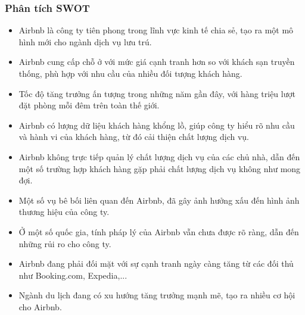 \subsubsection{Phân tích SWOT}
\begin{tcbraster}[raster columns=2, boxrule=0mm, arc=0mm]
\begin{tcolorbox}[equal height group=A, size=fbox, colback=swotS!60, colframe=swotS!80!black, title=\textsc{strengths}]
\begin{itemize}
\item Airbnb là công ty tiên phong trong lĩnh vực kinh tế chia sẻ, tạo ra một mô hình mới cho ngành dịch vụ lưu trú.
\item Airbnb cung cấp chỗ ở với mức giá cạnh tranh hơn so với khách sạn truyền thống, phù hợp với nhu cầu của nhiều đối tượng khách hàng.
\item Tốc độ tăng trưởng ấn tượng trong những năm gần đây, với hàng triệu lượt đặt phòng mỗi đêm trên toàn thế giới.
\item Airbnb có lượng dữ liệu khách hàng khổng lồ, giúp công ty hiểu rõ nhu cầu và hành vi của khách hàng, từ đó cải thiện chất lượng dịch vụ.
\end{itemize}
\end{tcolorbox}
\begin{tcolorbox}[equal height group=A, size=fbox, colback=swotW!60, colframe=swotW!80!black, title=\textsc{weaknesses}]
\begin{itemize}
\item Airbnb không trực tiếp quản lý chất lượng dịch vụ của các chủ nhà, dẫn đến một số trường hợp khách hàng gặp phải chất lượng dịch vụ không như mong đợi.
\item Một số vụ bê bối liên quan đến Airbnb, đã gây ảnh hưởng xấu đến hình ảnh thương hiệu của công ty.
\item Ở một số quốc gia, tính pháp lý của Airbnb vẫn chưa được rõ ràng, dẫn đến những rủi ro cho công ty.
\item Airbnb đang phải đối mặt với sự cạnh tranh ngày càng tăng từ các đối thủ như Booking.com, Expedia,...
\end{itemize}
\end{tcolorbox}
\begin{tcolorbox}[equal height group=B, size=fbox, colback=swotO!60, colframe=swotO!80!black, title=\textsc{opportunities}]
\begin{itemize}
\item Ngành du lịch đang có xu hướng tăng trưởng mạnh mẽ, tạo ra nhiều cơ hội cho Airbnb.

\end{itemize}
\end{tcolorbox}
\end{tcbraster}
